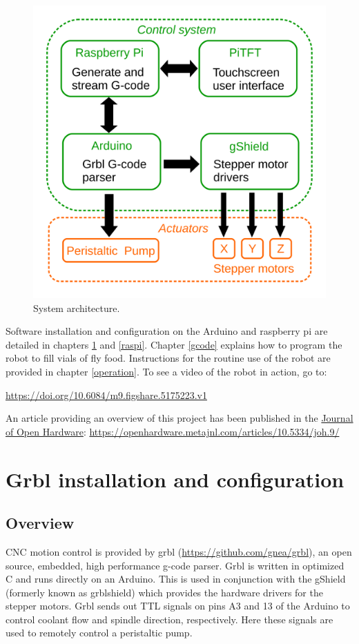 \documentclass[]{book}
\theoremstyle{definition}
\theoremstyle{definition}
\theoremstyle{definition}
\theoremstyle{remark}
\begin{document}
\begin{figure}

{\centering \includegraphics[width=0.75\linewidth]{images/system_architecture} 

}

\caption{System architecture.}\label{fig:architecture}
\end{figure}

Software installation and configuration on the Arduino and raspberry pi
are detailed in chapters \ref{grbl} and \ref{raspi}. Chapter \ref{gcode}
explains how to program the robot to fill vials of fly food.
Instructions for the routine use of the robot are provided in chapter
\ref{operation}. To see a video of the robot in action, go to:

\url{https://doi.org/10.6084/m9.figshare.5175223.v1}

An article providing an overview of this project has been published in
the \href{https://openhardware.metajnl.com/}{Journal of Open Hardware}:
\url{https://openhardware.metajnl.com/articles/10.5334/joh.9/}

\chapter{Grbl installation and configuration}\label{grbl}

\section{Overview}\label{overview}

CNC motion control is provided by grbl
(\url{https://github.com/gnea/grbl}), an open source, embedded, high
performance g-code parser. Grbl is written in optimized C and runs
directly on an Arduino. This is used in conjunction with the gShield
(formerly known as grblshield) which provides the hardware drivers for
the stepper motors. Grbl sends out TTL signals on pins A3 and 13 of the
Arduino to control coolant flow and spindle direction, respectively.
Here these signals are used to remotely control a peristaltic pump.
\end{document}
